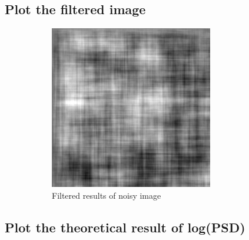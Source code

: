 \documentclass{article}
\begin{document}
\subsection{Plot the filtered image}
	\begin{description}
	\item[]
		\begin{figure}[h]
			\begin{center}
				\includegraphics[width=0.7\textwidth]{randimg_f.png}
				\caption{Filtered results of noisy image}
			\end{center}
		\end{figure}
	\end{description}

\pagebreak

\subsection{Plot the theoretical result of log(PSD)}
\end{document}
